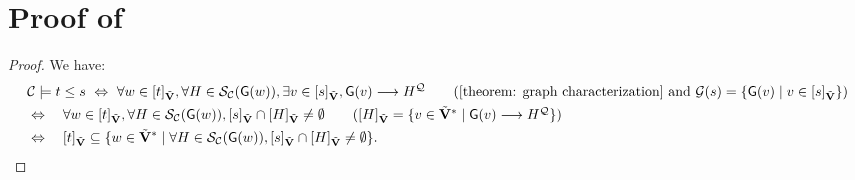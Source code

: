 \section{Proof of }\label{section: corollary: graph characterization}
\begin{proof}
    We have:
    \begin{align*}
        &\algclass \models \term[1] \le \term[2] \ \Leftrightarrow\  \forall \word \in \ljump{\term[1]}_{\tilde{\vsig}}, \forall \graph[2] \in \FillS_{\algclass}(\const{\graph}(\word)), \exists \word[2] \in \ljump{\term[2]}_{\tilde{\vsig}}, \const{\graph}(\word[2]) \homo \graph[2]^{\FillQ} \tag{\Cref{theorem: graph characterization} and $\glang(\term[2]) = \set{\const{\graph}(\word[2]) \mid \word[2] \in \ljump{\term[2]}_{\tilde{\vsig}}}$} \\
                                                & \Leftrightarrow\quad \forall \word \in \ljump{\term[1]}_{\tilde{\vsig}}, \forall \graph[2] \in \FillS_{\algclass}(\const{\graph}(\word)), \ljump{\term[2]}_{\tilde{\vsig}} \cap \ljump{\graph[2]}_{\tilde{\vsig}} \neq \emptyset \tag{$\ljump{\graph[2]}_{\tilde{\vsig}} = \set{\word[2] \in \tilde{\vsig}^* \mid \const{\graph}(\word[2]) \homo \graph[2]^{\FillQ}}$}                       \\
                                                & \Leftrightarrow\quad \ljump{\term[1]}_{\tilde{\vsig}} \subseteq \set{\word \in \tilde{\vsig}^* \mid \forall \graph[2] \in \FillS_{\algclass}(\const{\graph}(\word)), \ljump{\term[2]}_{\tilde{\vsig}} \cap \ljump{\graph[2]}_{\tilde{\vsig}} \neq \emptyset }. \tag*{\qedhere}
    \end{align*}
\end{proof}




\ifiscameraready
\else

\fi